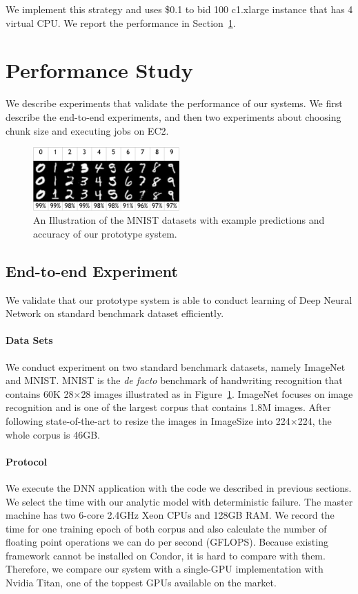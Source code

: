 \documentclass[11pt]{article}
\begin{document}
We implement this strategy and uses \$0.1 to bid 100 c1.xlarge
instance that has 4 virtual CPU. We report the performance in 
Section~\ref{sec:perf}.


\section{Performance Study} \label{sec:perf}

We describe experiments that validate the performance of our systems.
We first describe the end-to-end experiments, and then two
experiments about choosing chunk size and executing jobs on EC2.

\begin{figure}[t]
\centering
\includegraphics[width=0.5\textwidth]{figures/result-crop}
\caption{An Illustration of the MNIST datasets with
example predictions and accuracy of our prototype system.}
\label{fig:mnist}
\end{figure}


\subsection{End-to-end Experiment}

We validate that our prototype system is able to conduct
learning of Deep Neural Network on standard benchmark dataset
efficiently.

\paragraph*{Data Sets} We conduct experiment on two standard
benchmark datasets, namely ImageNet and MNIST. MNIST is the
{\em de facto} benchmark of handwriting recognition that contains
60K 28$\times$28 images illustrated as in Figure~\ref{fig:mnist}. ImageNet
focuses on image recognition and is one of the largest corpus
that contains 1.8M images. After following state-of-the-art to
resize the images in ImageSize into 224$\times$224, the whole
corpus is 46GB.

\paragraph*{Protocol} We execute the DNN application with the
code we described in previous sections. We select the time with
our analytic model with deterministic failure. The master
machine has two 6-core 2.4GHz Xeon CPUs and 128GB RAM.
We record the time for one training epoch of both corpus
and also calculate the number of floating point operations
we can do per second (GFLOPS). Because existing framework
cannot be installed on Condor, it is hard to compare with them.
Therefore, we compare our system with a single-GPU implementation
with Nvidia Titan, one of the toppest GPUs available on the market.
\end{document}
